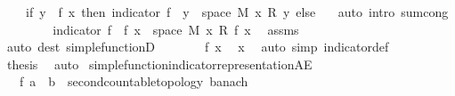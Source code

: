 \begin{isabellebody}
\ \ \ \ {\isacharparenleft}{\kern0pt}if\ y\ {\isacharequal}{\kern0pt}\ f\ x\ then\ indicator\ {\isacharparenleft}{\kern0pt}f\ {\isacharminus}{\kern0pt}{\isacharbackquote}{\kern0pt}\ {\isacharbraceleft}{\kern0pt}y{\isacharbraceright}{\kern0pt}\ {\isasyminter}\ space\ M{\isacharparenright}{\kern0pt}\ x\ {\isacharasterisk}{\kern0pt}\isactrlsub R\ y\ else\ {}{\isacharparenright}{\kern0pt}{\isacharparenright}{\kern0pt}{\isachardoublequoteclose}\ \isamarkupfalse%
\ {\isacharparenleft}{\kern0pt}auto\ intro{\isacharbang}{\kern0pt}{\isacharcolon}{\kern0pt}\ sum{\isachardot}{\kern0pt}cong{\isacharparenright}{\kern0pt}\isanewline
\ \ \isamarkupfalse%
\ \isamarkupfalse%
\ {\isachardoublequoteopen}{\isachardot}{\kern0pt}{\isachardot}{\kern0pt}{\isachardot}{\kern0pt}\ {\isacharequal}{\kern0pt}\ \ indicator\ {\isacharparenleft}{\kern0pt}f\ {\isacharminus}{\kern0pt}{\isacharbackquote}{\kern0pt}\ {\isacharbraceleft}{\kern0pt}f\ x{\isacharbraceright}{\kern0pt}\ {\isasyminter}\ space\ M{\isacharparenright}{\kern0pt}\ x\ {\isacharasterisk}{\kern0pt}\isactrlsub R\ f\ x{\isachardoublequoteclose}\ \isamarkupfalse%
\ assms\ \isamarkupfalse%
\ {\isacharparenleft}{\kern0pt}auto\ dest{\isacharcolon}{\kern0pt}\ simple{\isacharunderscore}{\kern0pt}functionD{\isacharparenright}{\kern0pt}\isanewline
\ \ \isamarkupfalse%
\ \isamarkupfalse%
\ {\isachardoublequoteopen}{\isachardot}{\kern0pt}{\isachardot}{\kern0pt}{\isachardot}{\kern0pt}\ {\isacharequal}{\kern0pt}\ f\ x{\isachardoublequoteclose}\ \isamarkupfalse%
\ x\ \isamarkupfalse%
\ {\isacharparenleft}{\kern0pt}auto\ simp{\isacharcolon}{\kern0pt}\ indicator{\isacharunderscore}{\kern0pt}def{\isacharparenright}{\kern0pt}\isanewline
\ \ \isamarkupfalse%
\ \isamarkupfalse%
\ {\isacharquery}{\kern0pt}thesis\ \isamarkupfalse%
\ auto\isanewline
{}\isamarkupfalse%
%
\endisatagproof
{\isafoldproof}%
%
\isadelimproof
\isanewline
%
\endisadelimproof
\isanewline
{}\isamarkupfalse%
\ simple{\isacharunderscore}{\kern0pt}function{\isacharunderscore}{\kern0pt}indicator{\isacharunderscore}{\kern0pt}representation{\isacharunderscore}{\kern0pt}AE{\isacharcolon}{\kern0pt}\isanewline
\ \ \ f\ {\isacharcolon}{\kern0pt}{\isacharcolon}{\kern0pt}{\isachardoublequoteopen}{\isacharprime}{\kern0pt}a\ {\isasymRightarrow}\ {\isacharprime}{\kern0pt}b\ {\isacharcolon}{\kern0pt}{\isacharcolon}{\kern0pt}\ {\isacharbraceleft}{\kern0pt}second{\isacharunderscore}{\kern0pt}countable{\isacharunderscore}{\kern0pt}topology{\isacharcomma}{\kern0pt}\ banach{\isacharbraceright}{\kern0pt}{\isachardoublequoteclose}\isanewline

\end{isabellebody}
